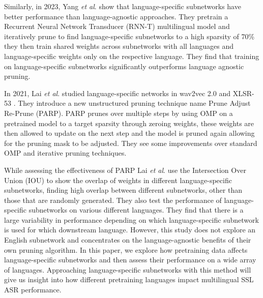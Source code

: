 Similarly, in 2023, Yang \textit{et al}. \cite{yang2023learning} show that language-specific subnetworks have better performance than language-agnostic approaches. They pretrain a Recurrent Neural Network Transducer (RNN-T) \cite{graves2012rnnt} multilingual model and iteratively prune to find language-specific subnetworks to a high sparsity of 70\% they then train shared weights across subnetworks with all languages and language-specific weights only on the respective language. They find that training on language-specific subnetworks significantly outperforms language agnostic pruning. %

In 2021, Lai \textit{et al}. \cite{PARP} studied language-specific networks in wav2vec 2.0 \cite{wav2vec} and XLSR-53 \cite{XLSR-53}. They introduce a new unstructured pruning technique name Prune Adjust Re-Prune (PARP). PARP prunes over multiple steps by using OMP on a pretrained model to a target sparsity through zeroing weights, these weights are then allowed to update on the next step and the model is pruned again allowing for the pruning mask to be adjusted. They see some improvements over standard OMP and iterative pruning techniques.

While assessing the effectiveness of PARP Lai \textit{et al}. \cite{PARP} use the Intersection Over Union (IOU) to show the overlap of weights in different language-specific subnetworks, finding high overlap between different subnetworks, other than those that are randomly generated. They also test the performance of language-specific subnetworks on various different languages. They find that there is a large variability in performance depending on which language-specific subnetwork is used for which downstream language. However, this study does not explore an English subnetwork and concentrates on the language-agnostic benefits of their own pruning algorithm. In this paper, we explore how pretraining data affects language-specific subnetworks and then assess their performance on a wide array of languages. Approaching language-specific subnetworks with this method will give us insight into how different pretraining languages impact multilingual SSL ASR performance.

